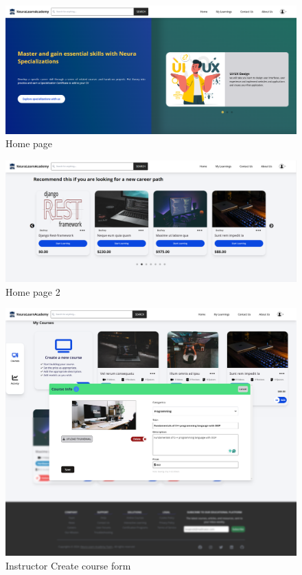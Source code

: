 \begin{figure}[h!]
	\centering
	\includegraphics[max height=\textheight,max width=\textwidth]{figures/frontend/Homepage.png}
	\caption{Home page}
\end{figure}

\begin{figure}[h!]
	\centering
	\includegraphics[max height=\textheight,max width=\textwidth]{figures/frontend/Homepage2.png}
	\caption{Home page 2}
\end{figure}

\begin{figure}[h!]
	\centering
	\includegraphics[max height=\textheight,max width=\textwidth]{figures/frontend/createcourse.png}
	\caption{Instructor Create course form}
\end{figure}